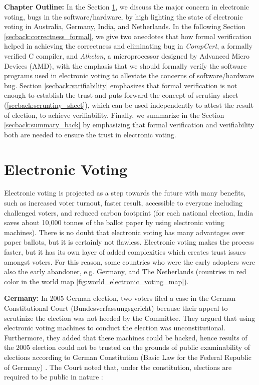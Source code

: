  
\textbf{Chapter Outline:}
 In the Section \ref{secback:electronic_voting}, we discuss 
 the major concern in electronic voting, bugs in the software/hardware, 
 by high lighting the 
 state of electronic voting in Australia, Germany, India, 
 and Netherlands. In the following Section \ref{secback:correctness_formal}, we  give 
 two anecdotes that how formal verification helped in achieving 
 the correctness and eliminating bug in \textit{CompCert}, a formally verified C compiler, 
 and \textit{Athelon}, a microprocessor designed by Advanced Micro Devices (AMD), with 
 the emphasis that we should formally verify the software programs
 used in electronic voting to alleviate the concerns of 
 software/hardware bug. Section \ref{secback:varifiability} 
 emphasizes that formal verification is not enough
 to establish the trust and puts forward the concept of 
 scrutiny sheet (\ref{secback:scruntiny_sheet}), which 
 can be used independently to attest the result of election, 
 to achieve verifiability. Finally, we summarize in the Section \ref{secback:summary_back}
 by emphasizing that formal verification and verifiability both are needed 
 to ensure the trust in electronic voting. 
 
  

\section{Electronic Voting}
 \label{secback:electronic_voting}
  Electronic voting is projected as a step towards the future with 
  many benefits, such as increased voter turnout, faster result, 
  accessible to everyone including challenged voters, and reduced 
  carbon footprint (for each 
  national election, India saves about 10,000 tonnes of the ballot 
  paper by using electronic voting machines). 
  There is no doubt that electronic voting has many advantages 
  over paper ballots, but it is certainly not flawless.  
  Electronic voting makes 
  the process faster, but it has its own layer of added complexities 
  which creates trust issues amongst voters. For this reason, some countries 
  who were the early adopters were also the early abandoner, e.g.
  Germany, and The Netherlands (countries in red color in the world map 
  \ref{fig:world_electronic_voting_map}).
  
  
  \textbf{Germany:} In 2005 German election, two voters filed a case in the German 
  Constitutional Court (Bundesverfassungsgericht) because their 
  appeal to scrutinize the election 
  was not heeded by the Committee. They argued that using electronic 
  voting machines to conduct the election was unconstitutional. Furthermore,
  they added that
  these machines could be hacked, hence results of the 2005 election 
  could not be trusted on the grounds 
  of public examinability of elections according to German Constitution 
  (Basic Law for the Federal Republic of Germany) \citep{Germanconst}. 
  The Court noted that, under the constitution, elections are 
  required to be public in nature \citep{Germanconst}:
  
